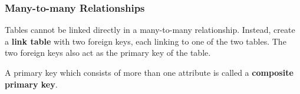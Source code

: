 \subsubsection*{Many-to-many Relationships}

Tables cannot be linked directly in a many-to-many relationship. Instead, create a \textbf{link table} with two foreign keys, each linking to one of the two tables. The two foreign keys also act as the primary key of the table.

A primary key which consists of more than one attribute is called a \textbf{composite primary key}.
